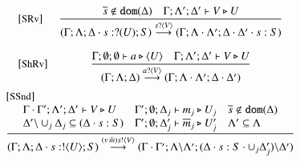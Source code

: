 \begin{figure}[t]
\[
\begin{array}{lc}
	\eltsrule{SRv}&\tree{
			\dual{s} \notin \dom{\Delta} \quad \Gamma; \Lambda'; \Delta' \proves V \hastype U
		}{
			(\Gamma; \Lambda; \Delta \cat s: \btinp{U} S) \by{\bactinp{s}{V}} (\Gamma; \Lambda\cat\Lambda'; \Delta\cat\Delta' \cat s: S)
		}
		\\[8mm]
		\eltsrule{ShRv}&\tree{
			\Gamma; \es; \es \proves a \hastype \chtype{U}
			\quad
			\Gamma; \Lambda'; \Delta' \proves V \hastype U
		}{
			(\Gamma; \Lambda; \Delta) \by{\bactinp{a}{{V}}} (\Gamma; \Lambda\cat\Lambda'; \Delta\cat\Delta')
		}
	\end{array}
	\]
	\[
	\begin{array}{l}
		\eltsrule{SSnd}\\
\tree{
			\begin{array}{lll}
			\Gamma \cat \Gamma'; \Lambda'; \Delta' \proves V \hastype U
&				
				\Gamma'; \es; \Delta_j \proves m_j  \hastype U_j
& 
				\dual{s} \notin \dom{\Delta}
\\
						\Delta'\backslash \cup_j \Delta_j \subseteq (\Delta \cat s: S)
& 
	\Gamma'; \es; \Delta_j' \proves \dual{m}_j  \hastype U_j'
& 
				\Lambda' \subseteq \Lambda
			\end{array}
		}{
			(\Gamma; \Lambda; \Delta \cat s: \btout{U} S) \by{\news{\tilde{m}} \bactout{s}{V}} (\Gamma \cat \Gamma'; \Lambda\backslash\Lambda';
			(\Delta \cat s: S \cat \cup_j \Delta_j') \backslash \Delta')
}
\end{array}\]
\end{figure}
